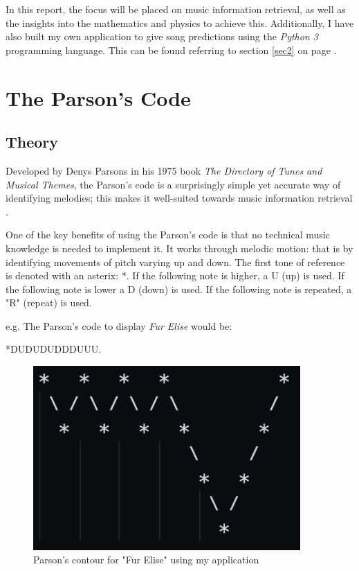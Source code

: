 \documentclass[a4paper,12pt]{article}
\begin{document}
In this report, the focus will be placed on music information retrieval, as well as the insights into the mathematics and physics to achieve this. Additionally, I have also built
my own application to give song predictions using the \textit{Python 3} programming language. This can be found referring to section
\ref{sec2} on page \pageref{sec2}.

\newpage

\normalsize
\section{The Parson's Code}

\subsection{Theory}
\label{sec1}    
Developed by Denys Parsons in his 1975 book \textit{The Directory of Tunes and Musical Themes}, the Parson's code is a surprisingly simple yet accurate way of identifying melodies; this makes it well-suited towards 
music information retrieval \parencite{ParsonsCodeDOTMT}.
\newline

One of the key benefits of using the Parson's code is that no technical music knowledge is needed to implement it. It works through melodic motion: that is by identifying movements of pitch varying up and down. The first tone of reference is denoted with an asterix: *. If the following note
is higher, a U (up) is used. If the following note is lower a D (down) is used. If the following note is repeated, a "R" (repeat) is used.
\newline

e.g. The Parson's code to display \textit{Fur Elise} would be:
\newline 

*DUDUDUDDDUUU.

\vspace{0.3cm}
\begin{figure}[h!]
    \includegraphics[width=10.2cm]{furelisecode.png}
    \centering
    \caption{Parson's contour for "Fur Elise" using my application}
    \end{figure}
\end{document}
